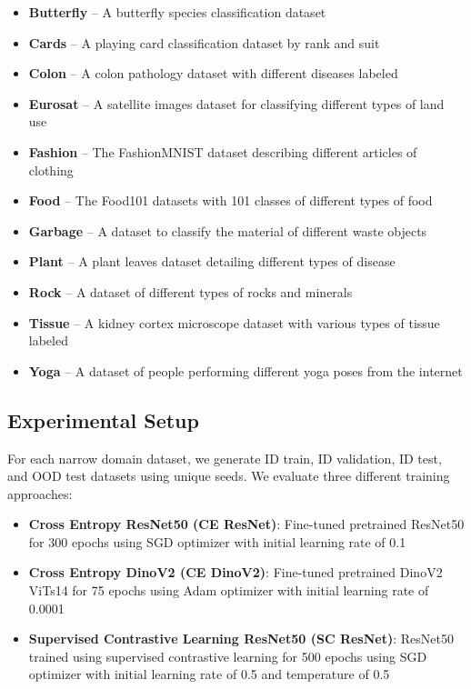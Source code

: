 \documentclass[11pt, oneside]{book}
\theoremstyle{plain}
\theoremstyle{definition}
\theoremstyle{remark}
\begin{document}
\begin{itemize}
\item \textbf{Butterfly} -- A butterfly species classification dataset \citep{AIPlanet_DataSprint107_2024}
\item \textbf{Cards} -- A playing card classification dataset by rank and suit \citep{card_data}
\item \textbf{Colon} -- A colon pathology dataset with different diseases labeled \citep{yang2023medmnist}
\item \textbf{Eurosat} -- A satellite images dataset for classifying different types of land use \citep{helber2019eurosat}
\item \textbf{Fashion} -- The FashionMNIST dataset describing different articles of clothing \citep{fashion}
\item \textbf{Food} -- The Food101 datasets \citep{food} with 101 classes of different types of food
\item \textbf{Garbage} -- A dataset to classify the material of different waste objects \citep{single2023realwaste}
\item \textbf{Plant} -- A plant leaves dataset detailing different types of disease \citep{plant}
\item \textbf{Rock} -- A dataset of different types of rocks and minerals \citep{rock_data}
\item \textbf{Tissue} -- A kidney cortex microscope dataset with various types of tissue labeled \citep{yang2023medmnist}
\item \textbf{Yoga} -- A dataset of people performing different yoga poses from the internet \citep{yoga_data}
\end{itemize}

\subsection{Experimental Setup}

For each narrow domain dataset, we generate ID train, ID validation, ID test, and OOD test datasets using unique seeds. We evaluate three different training approaches:

\begin{itemize}
\item \textbf{Cross Entropy ResNet50 (CE ResNet)}: Fine-tuned pretrained ResNet50 for 300 epochs using SGD optimizer with initial learning rate of 0.1
\item \textbf{Cross Entropy DinoV2 (CE DinoV2)}: Fine-tuned pretrained DinoV2 ViTs14 for 75 epochs using Adam optimizer with initial learning rate of 0.0001
\item \textbf{Supervised Contrastive Learning ResNet50 (SC ResNet)}: ResNet50 trained using supervised contrastive learning for 500 epochs using SGD optimizer with initial learning rate of 0.5 and temperature of 0.5
\end{itemize}
\end{document}
